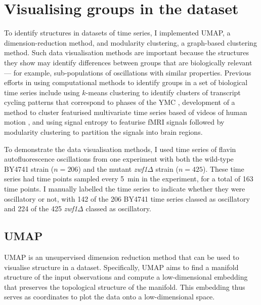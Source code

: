 \section{Visualising groups in the dataset}
\label{sec:analysis-clustering}

To identify structures in datasets of time series, I implemented UMAP, a dimension-reduction method, and modularity clustering, a graph-based clustering method.
Such data visualisation methods are important because the structures they show may identify differences between groups that are biologically relevant --- for example, sub-populations of oscillations with similar properties.
Previous efforts in using computational methods to identify groups in a set of biological time series include using $k$-means clustering to identify clusters of transcript cycling patterns that correspond to phases of the YMC \parencite{tuLogicYeastMetabolic2005}, development of a method to cluster featurised multivariate time series based of videos of human motion \parencite{wangStructureBasedStatisticalFeatures2007}, and using signal entropy to featurise fMRI signals followed by modularity clustering to partition the signals into brain regions.

To demonstrate the data visualisation methods, I used time series of flavin autofluorescence oscillations from one experiment with both the wild-type BY4741 strain ($n=206$) and the mutant \textit{zwf1$\Delta$} strain ($n=425$).
These time series had time points sampled every \SI{5}{\minute} in the experiment, for a total of 163 time points.
I manually labelled the time series to indicate whether they were oscillatory or not, with 142 of the 206 BY4741 time series classed as oscillatory and 224 of the 425 \textit{zwf1$\Delta$} classed as oscillatory.


\subsection{UMAP}
\label{subsec:analysis-clustering-umap}

UMAP \parencite{mcinnesUMAPUniformManifold2020} is an unsupervised dimension reduction method that can be used to visualise structure in a dataset.
Specifically, UMAP aims to find a manifold structure of the input observations and compute a low-dimensional embedding that preserves the topological structure of the manifold.
This embedding thus serves as coordinates to plot the data onto a low-dimensional space.

